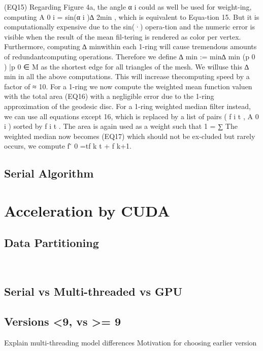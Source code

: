 \documentclass{article}
\begin{document}
(EQ15)
Regarding Figure 4a, the angle α i could as well be used for weight-ing, computing A 0 i = sin(α i )∆ 2min , which is equivalent to Equa-tion 15. But it is computationally expensive due to the sin(·) opera-tion and the numeric error is visible when the result of the mean fil-tering is rendered as color per vertex. Furthermore, computing ∆ minwithin each 1-ring will cause tremendous amounts of redundantcomputing operations. Therefore we define ∆ min := min{∆ min (p 0 ) |p 0 ∈ M} as the shortest edge for all triangles of the mesh. We willuse this ∆ min in all the above computations. This will increase thecomputing speed by a factor of ≈ 10. For a 1-ring we now compute the weighted mean function valuen with the total area 
(EQ16)
with a negligible error due to the 1-ring approximation of the geodesic disc. For a 1-ring weighted median filter instead, we can use all equations except 16, which is replaced by a list of pairs ( f i t , A 0 i ) sorted by f i t . The area is again used as a weight such that 1 = ∑ The weighted median now becomes
(EQ17)
which should not be ex-cluded but rarely occurs, we compute f  ̃ 0 =tf k t + f k+1.
\subsection{Serial Algorithm}
\section{Acceleration by CUDA}
\subsection{Data Partitioning}~\cite[p.~357]{Lang17}
\subsection{Serial vs Multi-threaded vs GPU}
\subsection{Versions <9, vs >= 9}
Explain multi-threading model differences
Motivation for choosing earlier version
\end{document}
